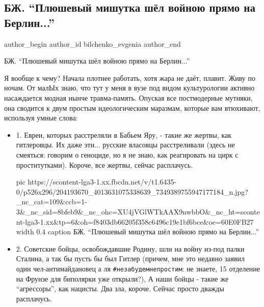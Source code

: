  
 
 
 
 
 
\subsection{БЖ. \enquote{Плюшевый мишутка шёл войною прямо на Берлин...}}
\label{sec:27_06_2021.fb.bilchenko_evgenia.1.projekt_pamjati}
\ifcmt
 author_begin
   author_id bilchenko_evgenia
 author_end
\fi

БЖ. \enquote{Плюшевый мишутка шёл войною прямо на Берлин...}

Я вообще к чему? Начала плотнее работать, хотя жара не даёт, плавит. Живу по
ночам. От малЫх знаю, что тут у меня в вузе под видом культурологии активно
насаждается модная нынче травма-память. Опуская все постмодерные мутняки, она
сводится к двум простым идеологическим маразмам, которые вам втюхивают,
используя умные слова:

\begin{itemize}
\item 1. Евреи, которых расстреляли в Бабьем Яру, - такие же жертвы, как гитлеровцы.
Их даже эти... русские власовцы расстреливали (здесь не смеяться: говорим о
геноциде, но я не знаю, как реагировать на цирк с проститутками). Короче, все
жертвы, сейчас расплачусь.

\ifcmt
  pic https://scontent-lga3-1.xx.fbcdn.net/v/t1.6435-0/p526x296/204193670_4013631075338639_7349389755947177184_n.jpg?_nc_cat=109&ccb=1-3&_nc_sid=8bfeb9&_nc_ohc=XU4jVGlWTkAAX9nwbbO&_nc_ht=scontent-lga3-1.xx&tp=6&oh=f8403db66205f358c6496c19e1bf6bce&oe=60E0FB27
  width 0.4
	caption БЖ. \enquote{Плюшевый мишутка шёл войною прямо на Берлин...}
\fi

\item 2. Советские бойцы, освобождавшие Родину, шли на войну из-под палки Сталина, а
так бы пусть бы был Гитлер (причем, мне это недавно заявил один
чел-антимайдановец а ля \verb|#незабудемнепростим|: не знаете, 15 отделение на Фрунзе
для биполярки уже открыли?), А наши бойцы - такие же \enquote{агрессоры}, как нацисты.
Два зла, короче. Сейчас просто дважды расплачусь.
\end{itemize}

